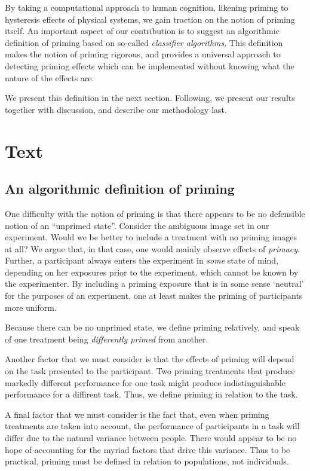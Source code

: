 \documentclass[a4paper]{report}
\begin{document}
By taking a computational approach to human cognition, likening priming to
hysteresis effects of physical systems, we gain traction on the notion of 
priming itself. An important aspect of our contribution is to suggest
an algorithmic definition of priming based on so-called 
\textit{classifier algorithms}.  This definition makes the notion of priming
rigorous, and provides a universal approach to detecting priming effects which
can be implemented without knowing what the nature of the effects are.

We present this definition in the next section.  Following, we present
our results together with discussion, and describe our methodology last.

\section*{Text}
\subsection*{An algorithmic definition of priming}
One difficulty with the notion of priming is that there appears to be no 
defensible notion of an ``unprimed state''.  Consider the ambiguous image set 
in our experiment.  Would we be better to include a treatment with no
priming images at all?  We argue that, in that case, one would mainly observe  
effects of \textit{primacy}.  
Further, a participant always enters the experiment in \textit{some} state of 
mind, depending on her exposures prior to the experiment, which cannot be 
known by the experimenter.  By including a priming exposure that is in some 
sense `neutral' for the purposes of an experiment, one at least makes the 
priming of participants more uniform.  

Because there
can be no unprimed state, we define priming relatively, and speak of one
treatment being \textit{differently primed} from another.

Another factor that we must consider is that the effects of priming will
depend on the task presented to the participant.  Two priming treatments that
produce markedly different performance for one task might produce 
indistinguishable performance for a diffirent task.  Thus, we define priming
in relation to the task.

A final factor that we must consider is the fact that, even when priming 
treatments are taken into account, the performance of participants in a task 
will differ due to the natural variance between people.  There would appear to
be no hope of accounting for the myriad factors that drive this variance.  Thus
to be practical, priming must be defined in relation to populations, not
individuals.
\end{document}
